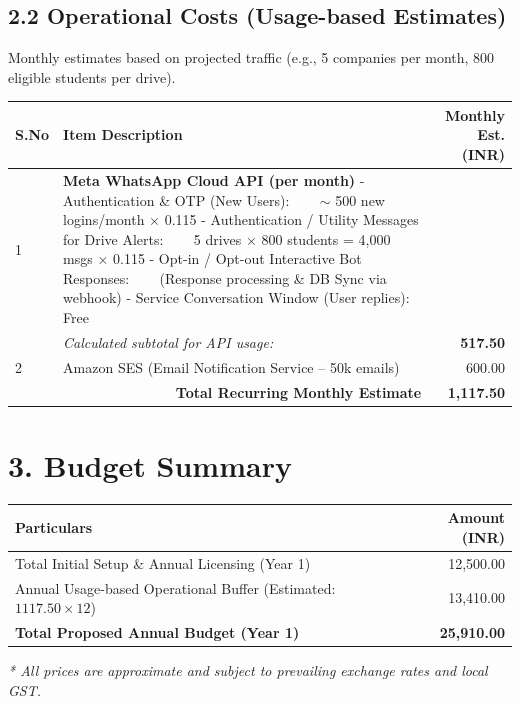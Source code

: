 \documentclass[12pt,a4paper]{article}
\begin{document}
\subsection*{2.2 Operational Costs (Usage-based Estimates)}
Monthly estimates based on projected traffic (e.g., 5 companies per month, 800 eligible students per drive).

\vspace{0.3cm}
\noindent
\renewcommand{\arraystretch}{1.5}
\begin{tabular}{|l|p{10cm}|r|}
\hline
\textbf{S.No} & \textbf{Item Description} & \textbf{Monthly Est. (INR)} \\ \hline
1 & \textbf{Meta WhatsApp Cloud API (per month)} \newline
    - Authentication \& OTP (New Users): \newline ~~~ $\sim$ 500 new logins/month $\times$ 0.115 \newline
    - Authentication / Utility Messages for Drive Alerts: \newline ~~~ 5 drives $\times$ 800 students = 4,000 msgs $\times$ 0.115 \newline
    - Opt-in / Opt-out Interactive Bot Responses: \newline ~~~ (Response processing \& DB Sync via webhook) \newline
    - Service Conversation Window (User replies): Free &  \\ 
  & \raggedleft \textit{Calculated subtotal for API usage:} & \textbf{517.50} \\ \hline
2 & Amazon SES (Email Notification Service -- 50k emails) & 600.00 \\ \hline
\multicolumn{2}{|r|}{\textbf{Total Recurring Monthly Estimate}} & \textbf{1,117.50} \\ \hline
\end{tabular}
\vspace{0.5cm}

\section*{3. Budget Summary}
\vspace{0.3cm}
\noindent
\renewcommand{\arraystretch}{1.5}
\begin{tabular}{|p{10cm}|r|}
\hline
\textbf{Particulars} & \textbf{Amount (INR)} \\ \hline
Total Initial Setup \& Annual Licensing (Year 1) & 12,500.00 \\ \hline
Annual Usage-based Operational Buffer (Estimated: $1117.50 \times 12$) & 13,410.00 \\ \hline
\textbf{Total Proposed Annual Budget (Year 1)} & \textbf{25,910.00} \\ \hline
\end{tabular}
\vspace{0.5cm}



\vfill
\begin{center}
    \textit{* All prices are approximate and subject to prevailing exchange rates and local GST.}
\end{center}
\end{document}
